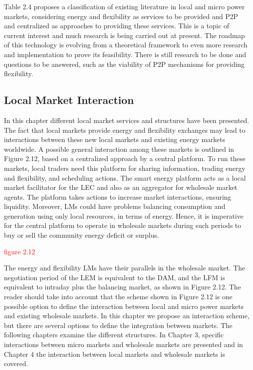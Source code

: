 Table 2.4 proposes a classification of existing literature in local and micro power markets, considering energy and flexibility as services to be provided and P2P and centralized as approaches to providing these services. This is a topic of current interest and much research is being carried out at present. The roadmap of this technology is evolving from a theoretical framework to even more research and implementation to prove its feasibility. There is still research to be done and questions to be answered, such as the viability of P2P mechanisms for providing flexibility.

\subsection{Local Market Interaction}
In this chapter different local market services and structures have been presented. The fact that local markets provide energy and flexibility exchanges may lead to interactions between these new local markets and existing energy markets worldwide. A possible general interaction among these markets is outlined in Figure 2.12, based on a centralized approach by a central platform. To run these markets, local traders need this platform for sharing information, trading energy and flexibility, and scheduling actions. The smart energy platform acts as a local market facilitator for the LEC and also as an aggregator for wholesale market agents. The platform takes actions to increase market interactions, ensuring liquidity. Moreover, LMs could have problems balancing consumption and generation using only local resources, in terms of energy. Hence, it is imperative for the central platform to operate in wholesale markets during such periods to buy or sell the community energy deficit or surplus.

\textcolor{red}{figure 2.12}

The energy and flexibility LMs have their parallels in the wholesale market. The negotiation period of the LEM is equivalent to the DAM, and the LFM is equivalent to intraday plus the balancing market, as shown in Figure 2.12. The reader should take into account that the scheme shown in Figure 2.12 is one possible option to define the interaction between local and micro power markets and existing wholesale markets. In this chapter we propose an interaction scheme, but there are several options to define the integration between markets. The following chapters examine the different structures. In Chapter 3, specific interactions between micro markets
and wholesale markets are presented and in Chapter 4 the interaction between local markets and wholesale
markets is covered.

